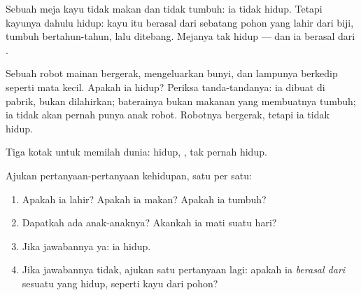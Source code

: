 \begin{example}\label{ex:g1:living-or-not:table}
Sebuah meja kayu tidak makan dan tidak tumbuh: ia tidak hidup. Tetapi
kayunya dahulu hidup: kayu itu berasal dari sebatang pohon yang lahir
dari biji, tumbuh bertahun-tahun, lalu ditebang. Mejanya tak hidup ---
dan ia berasal dari .
\end{example}

\begin{example}\label{ex:g1:living-or-not:robot}
Sebuah robot mainan bergerak, mengeluarkan bunyi, dan lampunya
berkedip seperti mata kecil. Apakah ia hidup? Periksa tanda-tandanya:
ia dibuat di pabrik, bukan dilahirkan; baterainya bukan makanan yang
membuatnya tumbuh; ia tidak akan pernah punya anak robot. Robotnya
bergerak, tetapi ia tidak hidup.
\end{example}

\begin{omfigure}

{\small Tiga kotak untuk memilah dunia: hidup, , tak
pernah hidup.}
\end{omfigure}

\begin{method}\label{met:g1:living-or-not:decide}
Ajukan pertanyaan-pertanyaan kehidupan, satu per satu:
\begin{enumerate}
  \item Apakah ia lahir? Apakah ia makan? Apakah ia tumbuh?
  \item Dapatkah ada anak-anaknya? Akankah ia mati suatu hari?
  \item Jika jawabannya ya: ia hidup.
  \item Jika jawabannya tidak, ajukan satu pertanyaan lagi: apakah ia
        \emph{berasal dari} sesuatu yang hidup, seperti kayu dari pohon?
\end{enumerate}
\end{method}

